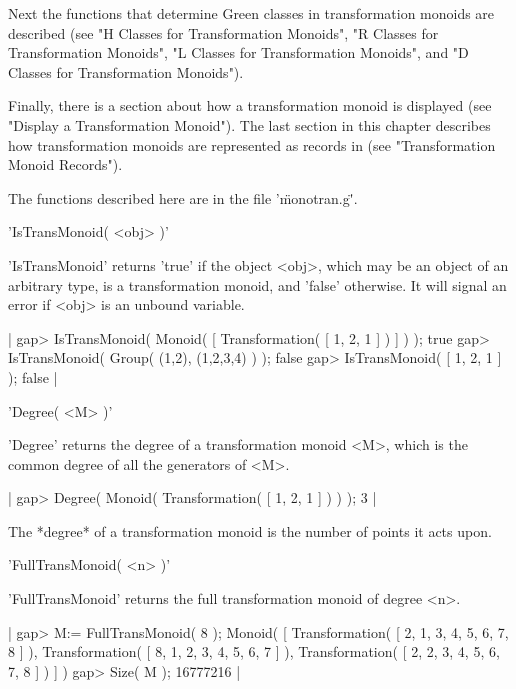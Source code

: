 Next the functions that determine Green classes in transformation monoids
are described (see "H Classes for Transformation Monoids", "R Classes for
Transformation Monoids", "L Classes  for Transformation Monoids", and  "D
Classes for Transformation Monoids").

Finally,  there is  a  section   about how  a  transformation  monoid  is
displayed (see "Display a  Transformation Monoid").  The last section  in
this  chapter  describes how  transformation   monoids are represented as
records in {\GAP} (see "Transformation Monoid Records").

The functions described here are in the file '\"monotran.g\"'.

%

'IsTransMonoid( <obj> )'

'IsTransMonoid'  returns  'true' if the object    <obj>, which may  be an
object  of an  arbitrary type,  is  a transformation monoid, and  'false'
otherwise.  It will signal an error if <obj> is an unbound variable.

|    gap> IsTransMonoid( Monoid( [ Transformation( [ 1, 2, 1 ] ) ] ) );
    true
    gap> IsTransMonoid( Group( (1,2), (1,2,3,4) ) );
    false
    gap> IsTransMonoid( [ 1, 2, 1 ] );
    false |


'Degree( <M> )'

'Degree' returns the degree of a  transformation monoid <M>, which is the
common degree of all the generators of <M>.

|    gap> Degree( Monoid( Transformation( [ 1, 2, 1 ] ) ) );
    3 |

The *degree* of a transformation monoid is the  number  of points it acts
upon.

%

'FullTransMonoid( <n> )'

'FullTransMonoid' returns the full transformation monoid of degree <n>.

|    gap> M:= FullTransMonoid( 8 );
    Monoid( [ Transformation( [ 2, 1, 3, 4, 5, 6, 7, 8 ] ), 
      Transformation( [ 8, 1, 2, 3, 4, 5, 6, 7 ] ), 
      Transformation( [ 2, 2, 3, 4, 5, 6, 7, 8 ] ) ] ) 
    gap> Size( M );
    16777216 |

